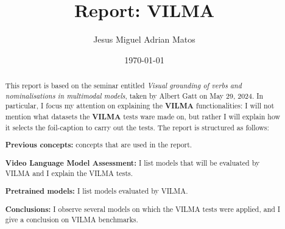 \documentclass[]{article}
\title{Report: V{\small I}LMA}
\author{Jesus Miguel Adrian Matos}
\date{\today}
\theoremstyle{theorem}
\begin{document}
\maketitle

\begin{abstract} 
\noindent This report is based on the seminar entitled {\it Visual grounding of verbs and nominalisations in multimodal models}, taken by Albert Gatt on May 29, 2024.
In particular, I focus my attention on explaining the \textbf{VILMA} functionalities: I will not mention what datasets the \textbf{VILMA} tests ware made on, but rather I will explain how it selects the foil-caption to carry out the tests. The report is structured as follows:

\textbf{Previous concepts:} concepts that are used in the report.

\textbf{Video Language Model Assessment:} I list models that will be evaluated by VILMA and I explain the VILMA tests.

\textbf{Pretrained models:} I list models evaluated by VILMA.

\textbf{Conclusions:} I observe several models on which the VILMA tests were applied, and I give a conclusion on VILMA benchmarks.




\end{abstract}






\newpage

\end{document}
